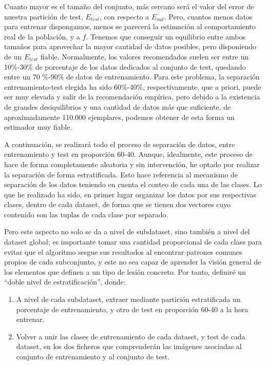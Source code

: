 Cuanto mayor es el tamaño del conjunto, más cercano será el valor del error de nuestra partición de test, $E_{test}$, con respecto a $E_{out}$. Pero, cuantos menos datos para entrenar dispongamos, menos se parecerá la estimación al comportamiento real de la población, y a $f$. Tenemos que conseguir un equilibrio entre ambos tamaños para aprovechar la mayor cantidad de datos posibles, pero disponiendo de un $E_{test}$ fiable. Normalmente, los valores recomendados suelen ser entre un 10\%-30\% de porcentaje de los datos dedicados al conjunto de test, quedando entre un 70 \%-90\% de datos de entrenamiento. Para este problema, la separación entrenamiento-test elegida ha sido 60\%-40\%, respectivamente, que a priori, puede ser muy elevada y salir de la recomendación empírica, pero debido a la existencia de grandes desiquilibrios y una cantidad de datos más que suficiente, de aproximadamente 110.000 ejemplares, podemos obtener de esta forma un estimador muy fiable.

A continuación, se realizará todo el proceso de separación de datos, entre entrenamiento y test en proporción 60-40. Aunque, idealmente, este proceso de hace de forma completamente aleatoria y sin intervención, he optado por realizar la separación de forma estratificada. Esto hace referencia al mecanismo de separación de los datos teniendo en cuenta el conteo de cada una de las clases. Lo que he realizado ha sido, en primer lugar organizar los datos por sus respectivas clases, dentro de cada dataset, de forma que se tienen dos vectores cuyo contenido son las tuplas de cada clase por separado. 

Pero este aspecto no solo se da a nivel de subdataset, sino también a nivel del dataset global; es importante tomar una cantidad proporcional de cada clase para evitar que el algoritmo sesgue sus resultados al encontrar patrones comunes propios de cada subconjunto, y este no sea capaz de aprender la visión general de los elementos que definen a un tipo de lesión concreto. Por tanto, definiré un ``doble nivel de estratificación'', donde:

\begin{enumerate}
	\item A nivel de cada subdataset, extraer mediante partición estratificada un porcentaje de entrenamiento, y otro de test en proporción 60-40 a la hora entrenar.
	\item Volver a unir las clases de entrenamiento de cada dataset, y test de cada dataset, en los dos ficheros que comprenderán las imágenes asociadas al conjunto de entrenamiento y al conjunto de test.
\end {enumerate}

